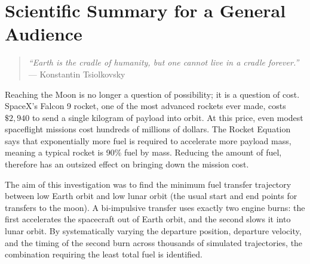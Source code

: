 \documentclass[10pt,twocolumn]{revtex4-2}    %
\begin{document}
\onecolumngrid %

\section*{Scientific Summary for a General Audience}

\begin{quote}
\textit{``Earth is the cradle of humanity, but one cannot live in a cradle forever.''}\\
\hfill --- Konstantin Tsiolkovsky
\end{quote}

Reaching the Moon is no longer a question of possibility; it is a question of cost. SpaceX's Falcon 9 rocket, one of the most advanced rockets ever made, costs $\$2{,}940$ to send a single kilogram of payload into orbit. At this price, even modest spaceflight missions cost hundreds of millions of dollars. The Rocket Equation says that exponentially more fuel is required to accelerate more payload mass, meaning a typical rocket is 90\% fuel by mass. Reducing the amount of fuel, therefore has an outsized effect on bringing down the mission cost.

The aim of this investigation was to find the minimum fuel transfer trajectory between low Earth orbit and low lunar orbit (the usual start and end points for transfers to the moon). A bi-impulsive transfer uses exactly two engine burns: the first accelerates the spacecraft out of Earth orbit, and the second slows it into lunar orbit. By systematically varying the departure position, departure velocity, and the timing of the second burn across thousands of simulated trajectories, the combination requiring the least total fuel is identified.
\end{document}
